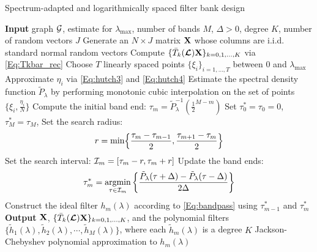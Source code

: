 \documentclass[journal, 10pt]{IEEEtran}
\begin{document}
\begin{algorithm}[tb]
\caption{Spectrum-adapted and logarithmically spaced filter bank design}
\begin{algorithmic}
\State \textbf{Input} graph ${\mathcal{G}}$, estimate for $\lambda_{\max}$, number of bands $M$, $\Delta>0$, degree $K$, number of random vectors $J$
\State Generate an $N \times J$ matrix $\bf{X}$  whose columns are i.i.d. standard normal random vectors
\State Compute $\{\bar{T}_k(\boldsymbol{\mathcal{L}}){\bf X}\}_{k=0,1,\ldots,K}$  via \eqref{Eq:Tkbar_rec}%
\State Choose $T$ linearly spaced points $\{\xi_i\}_{i=1,\ldots,T}$ between 0 and $\lambda_{\max}$
\State Approximate $\eta_{i}$ via \eqref{Eq:hutch3} and \eqref{Eq:hutch4} %
\EndFor
\State Estimate the spectral density function $\tilde{P}_{\lambda}$ by performing monotonic cubic interpolation on the set of points $\{\xi_i, \frac{\eta_i}{N} \}$ 
\State Compute the initial band end: $\tau_m = \tilde{P}_{\lambda}^{-1}(\frac{1}{2}^{M-m})$
\EndFor
\State Set $\tau_0^* = \tau_0 = 0$, $\tau_M^* = \tau_M$, 
\State Set the search radius: $$r = \text{min} \Bigl\{\frac{\tau_m-\tau_{m-1}}{2}, \frac{\tau_{m+1}-\tau_m}{2}\Bigr\}$$
\State Set the search interval: ${\cal I}_m = [\tau_m-r, \tau_m+r]$
\State Update the band ends: $$\tau_m^* = \underset{\tau \in {\cal I}_m}{\text{argmin}} \left\{\frac{\tilde{P}_{\lambda}(\tau+\Delta)-\tilde{P}_{\lambda}(\tau-\Delta)}{2\Delta}\right\}$$
\EndFor
{}
\State Construct the ideal filter $h_m(\lambda)$ according to \eqref{Eq:bandpass} using $\tau_{m-1}^*$ and $\tau_m^*$%
\EndFor
\State \textbf{Output} $\bf{X}$, $\{\bar{T}_k(\boldsymbol{\mathcal{L}}){\bf X}\}_{k=0,1,\ldots,K}$, and the
polynomial filters $\{ \tilde{h}_1(\lambda), \tilde{h}_2(\lambda), \cdots, \tilde{h}_M(\lambda)\}$, where each $\tilde{h}_m(\lambda)$ is a degree $K$ Jackson-Chebyshev polynomial approximation to  $h_m(\lambda)$ %
\end{algorithmic}
\label{Al:filter_bank}
\end{algorithm}
\end{document}
